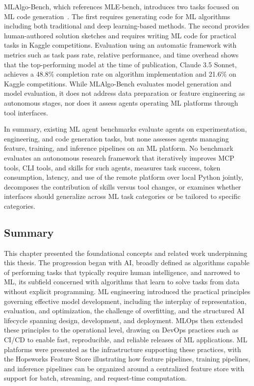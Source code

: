 \documentclass[
english,                 %
bibtex,                  %
includeExtraAbstracts, %
]{kththesis}
\numberwithin{listing}{chapter}
\begin{document}
\gls{ML}Algo-Bench, which references \gls{MLE}-bench, introduces two tasks focused on \gls{ML} code generation~\cite{wang_mlalgo-bench_2025}. The first requires generating code for \gls{ML} algorithms including both traditional and deep learning-based methods. The second provides human-authored solution sketches and requires writing \gls{ML} code for practical tasks in Kaggle competitions. Evaluation using an automatic framework with metrics such as task pass rate, relative performance, and time overhead shows that the top-performing model at the time of publication, Claude 3.5 Sonnet, achieves a 48.8\% completion rate on algorithm implementation and 21.6\% on Kaggle competitions. While \gls{ML}Algo-Bench evaluates model generation and model evaluation, it does not address data preparation or feature engineering as autonomous stages, nor does it assess agents operating \gls{ML} platforms through tool interfaces.

In summary, existing \gls{ML} agent benchmarks evaluate agents on experimentation, engineering, and code generation tasks, but none assesses agents managing feature, training, and inference pipelines on an \gls{ML} platform. No benchmark evaluates an autonomous research framework that iteratively improves \gls{MCP} tools, \gls{CLI} tools, and skills for such agents, measures task success, token consumption, latency, and use of the remote platform over local Python jointly, decomposes the contribution of skills versus tool changes, or examines whether interfaces should generalize across \gls{ML} task categories or be tailored to specific categories.

\subsection{Summary}
\glsresetall

This chapter presented the foundational concepts and related work underpinning this thesis. The progression began with \gls{AI}, broadly defined as algorithms capable of performing tasks that typically require human intelligence, and narrowed to \gls{ML}, its subfield concerned with algorithms that learn to solve tasks from data without explicit programming. \Gls{ML} engineering introduced the practical principles governing effective model development, including the interplay of representation, evaluation, and optimization, the challenge of overfitting, and the structured \gls{AI} lifecycle spanning design, development, and deployment. \Gls{MLOps} then extended these principles to the operational level, drawing on \gls{DevOps} practices such as \gls{CI/CD} to enable fast, reproducible, and reliable releases of \gls{ML} applications. \Gls{ML} platforms were presented as the infrastructure supporting these practices, with the Hopsworks Feature Store illustrating how feature pipelines, training pipelines, and inference pipelines can be organized around a centralized feature store with support for batch, streaming, and request-time computation.
\end{document}
